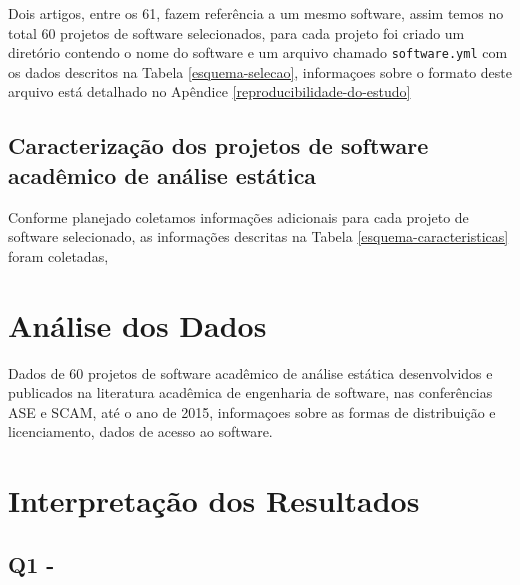 Dois artigos, entre os 61, fazem referência a um mesmo software, assim temos no
total 60 projetos de software selecionados, para cada projeto foi criado um
diretório contendo o nome do software e um arquivo chamado
\texttt{software.yml} com os dados descritos na Tabela \ref{esquema-selecao},
informaçoes sobre o formato deste arquivo está detalhado no Apêndice
\ref{reproducibilidade-do-estudo}


\subsection{Caracterização dos projetos de software acadêmico de análise estática} %

Conforme planejado coletamos informações adicionais para cada projeto de
software selecionado, as informações descritas na Tabela
\ref{esquema-caracteristicas} foram coletadas,


\section{Análise dos Dados} \label{estudo1:analise}

Dados de 60 projetos de software acadêmico de análise estática desenvolvidos e
publicados na literatura acadêmica de engenharia de software, nas conferências
ASE e SCAM, até o ano de 2015, informaçoes sobre as formas de distribuição e
licenciamento, dados de acesso ao software.




\section{Interpretação dos Resultados} \label{estudo1:interpretacao}

\subsection{Q1 - \EstudoUmQuestaoUm} %

